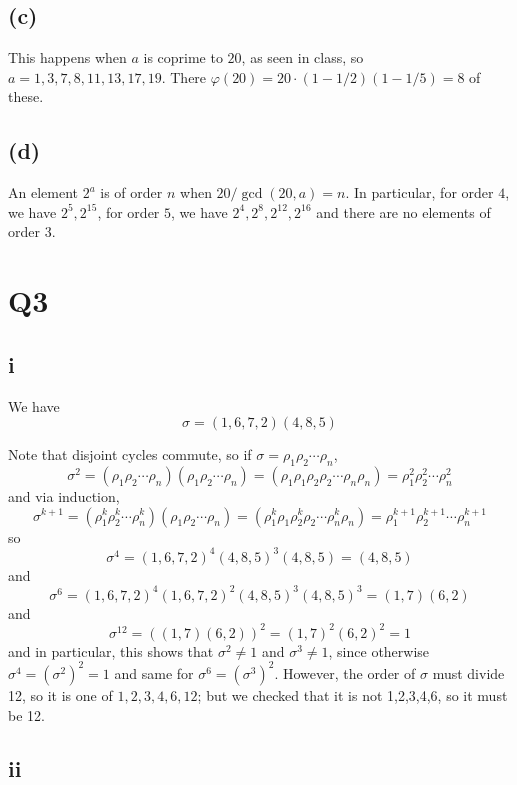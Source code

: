 \documentclass[12pt,letterpaper]{article}
\theoremstyle{definition}
\begin{document}
\subsection*{(c)}

This happens when $a$ is coprime to $20$, as seen in class, so $a = 1, 3, 7, 8, 11, 13, 17, 19$. There $\varphi(20) = 20 \cdot (1 - 1/2)(1-1/5) = 8$ of these.

\subsection*{(d)}

An element $2^{a}$ is of order $n$ when $20/\gcd(20,a) = n$. In particular, for order $4$, we have $2^{5}, 2^{15}$, for order $5$, we have $2^{4}, 2^{8}, 2^{12}, 2^{16}$ and there are no elements of order $3$.

\section*{Q3}

\subsection*{i}

We have
\[
  \sigma = (1, 6, 7, 2)(4,8,5)
\]

Note that disjoint cycles commute, so if $\sigma = \rho_{1}\rho_{2}\cdots\rho_{n}$,
\[
  \sigma^{2} = (\rho_{1}\rho_{2}\cdots\rho_{n})(\rho_{1}\rho_{2}\cdots\rho_{n}) = (\rho_{1}\rho_{1}\rho_{2}\rho_{2}\cdots\rho_{n}\rho_{n}) = \rho_{1}^{2}\rho_{2}^{2}\cdots\rho_{n}^{2}
\]
and via induction,
\[
  \sigma^{k+1} = (\rho_{1}^{k}\rho_{2}^{k}\cdots\rho_{n}^{k})(\rho_{1}\rho_{2}\cdots\rho_{n}) = (\rho_{1}^{k}\rho_{1}\rho_{2}^{k}\rho_{2}\cdots\rho_{n}^{k}\rho_{n}) = \rho_{1}^{k+1}\rho_{2}^{k+1}\cdots\rho_{n}^{k+1}
\]
so
\[
  \sigma^{4} = (1,6,7,2)^{4}(4,8,5)^{3}(4,8,5) = (4,8,5)
\]
and
\[
  \sigma^{6} = (1,6,7,2)^{4}(1,6,7,2)^{2}(4,8,5)^{3}(4,8,5)^{3} = (1,7)(6,2)
\]
and
\[
  \sigma^{12} = ((1,7)(6,2))^{2} = (1,7)^{2}(6,2)^{2} = 1
\]
and in particular, this shows that $\sigma^{2} \neq 1$ and $\sigma^{3} \neq 1$, since otherwise $\sigma^{4} = (\sigma^{2})^{2} = 1$ and same for $\sigma^{6} = (\sigma^{3})^{2}$. However, the order of $\sigma$ must divide 12, so it is one of $1, 2, 3, 4, 6, 12$; but we checked that it is not 1,2,3,4,6, so it must be 12.

\subsection*{ii}
\end{document}
